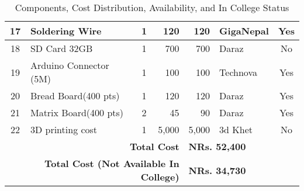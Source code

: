 \begin{table}[h]
{\begin{tabular}{|c|p{4.6cm}|c|r|r|p{3cm}|c|}
17 & Soldering Wire & 1 & 120 & 120 & GigaNepal & Yes \\\hline
18 & SD Card 32GB & 1 & 700 & 700 & Daraz & No \\\hline
19 & Arduino Connector (5M) & 1 & 100 & 100 & Technova & Yes \\\hline
20 & Bread Board(400 pts) & 1 & 120 & 120 & Daraz & Yes \\\hline
21 & Matrix Board(400 pts) & 2 & 45  & 90 & Daraz & Yes \\\hline
22 & 3D printing cost & 1 & 5,000  & 5,000 & 3d Khet & No \\
\hline
\multicolumn{4}{|r|}{\textbf{Total Cost}} & \multicolumn{3}{l|}{\textbf{NRs. 52,400}} \\
\hline
\multicolumn{4}{|r|}{\textbf{Total Cost (Not Available In College)}} & \multicolumn{3}{l|}{\textbf{NRs. 34,730}} \\
\hline
\end{tabular}
}
\caption{Components, Cost Distribution, Availability, and In College Status}
\end{table}
